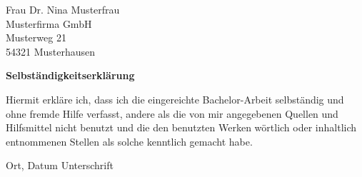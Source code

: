 \documentclass[11pt,DIV12,BCOR0mm,twoside,openright,headings=normal,%
  numbers=noenddot,headsepline,headinclude]{scrreprt}
\begin{document}
\vspace*{.5\baselineskip}
\noindent
Frau Dr. Nina Musterfrau\\
Musterfirma GmbH\\
Musterweg 21\\
54321 Musterhausen


\vfill
\noindent
{\sffamily\bfseries Selbständigkeitserklärung}

\vspace*{.5\baselineskip}
\noindent
Hiermit erkläre ich, dass ich die eingereichte Bachelor-Arbeit selbständig und ohne fremde Hilfe verfasst, andere als die von mir angegebenen Quellen und Hilfsmittel nicht benutzt und die den benutzten Werken wörtlich oder inhaltlich entnommenen Stellen als solche kenntlich gemacht habe.

\vspace*{3\baselineskip}
\noindent
Ort, Datum\hspace{5cm} Unterschrift
\tableofcontents

\cleardoublepage
{}





\appendix



\printbibliography
\end{document}

